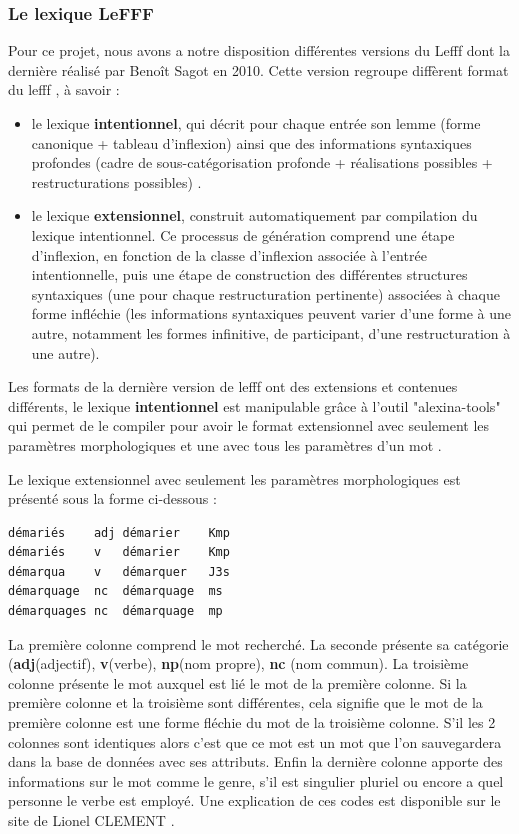 \documentclass[12pt,a4paper]{article}
\begin{document}
\subsubsection{Le lexique LeFFF }
Pour ce projet, nous avons a notre  disposition différentes versions  du Lefff  dont la dernière réalisé par Benoît Sagot en 2010. Cette version regroupe diffèrent format du lefff , à savoir \cite{lefff_int} :
\begin{itemize}
\item le lexique \textbf{intentionnel}, qui décrit pour chaque entrée son lemme (forme canonique + tableau d'inflexion) ainsi que des informations syntaxiques profondes (cadre de sous-catégorisation profonde + réalisations possibles + restructurations possibles) .
\item le lexique \textbf{extensionnel}, construit automatiquement par compilation du lexique intentionnel. Ce processus de génération comprend une étape d'inflexion, en fonction de la classe d'inflexion associée à l'entrée intentionnelle, puis une étape de construction des différentes structures syntaxiques (une pour chaque restructuration pertinente) associées à chaque forme infléchie (les informations syntaxiques peuvent varier d'une forme à une autre, notamment les formes infinitive, de participant, d'une restructuration à une autre).
\end{itemize} 

\smallbreak Les formats de la dernière version de lefff ont des extensions et contenues différents, le lexique \textbf{intentionnel} est manipulable grâce à l'outil "alexina-tools" qui permet de le compiler pour avoir le format extensionnel avec seulement les paramètres morphologiques et une avec tous les paramètres d'un mot .

Le lexique extensionnel avec seulement les paramètres morphologiques est présenté sous la forme ci-dessous :
\begin{verbatim}
démariés	adj	démarier	Kmp
démariés	v	démarier	Kmp
démarqua	v	démarquer	J3s
démarquage	nc	démarquage	ms
démarquages	nc	démarquage	mp
\end{verbatim}

\smallbreak La première colonne comprend le mot recherché. 
\smallbreak La seconde présente sa catégorie (\textbf{adj}(adjectif), \textbf{v}(verbe), \textbf{np}(nom propre), \textbf{nc} (nom commun).
\smallbreak La troisième colonne présente le mot auxquel est lié le mot de la première colonne.
Si la première colonne et la troisième sont différentes, cela signifie que le mot de la première colonne est une forme fléchie du mot de la troisième colonne. S'il les 2 colonnes sont identiques alors c'est que ce mot est un mot que l'on sauvegardera dans la base de données avec ses attributs.
Enfin la dernière colonne apporte des informations sur le mot comme le genre, s'il est singulier pluriel ou encore a quel personne le verbe est employé. Une explication de ces codes est disponible sur le site de Lionel CLEMENT \cite{tagset}.
\end{document}
